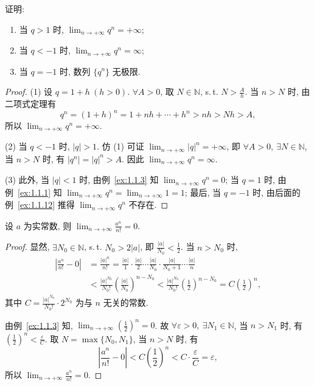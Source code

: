 \begin{example}\label{ex:1.1.4}
证明:
\begin{enumerate}
  \item 当 $q>1$ 时, $\lim_{n\to+\infty}q^n=+\infty$;
  \item 当 $q<-1$ 时, $\lim_{n\to+\infty}q^n=\infty$;
  \item 当 $q=-1$ 时, 数列 $\{q^n\}$ 无极限.
\end{enumerate}
\end{example}
\begin{proof}
(1) 设 $q=1+h\ (h>0)$. $\forall A>0$, 取 $N\in\mathbb{N}$, s.\,t. $N>\frac{A}{h}$. 当 $n>N$ 时, 由二项式定理有
\[
  q^n=(1+h)^n = 1+nh+\cdots+h^n > nh > Nh > A,
\]
所以 $\lim_{n\to+\infty}q^n=+\infty$.

(2) 当 $q<-1$ 时, $|q|>1$. 仿 (1) 可证 $\lim_{n\to+\infty}|q|^n=+\infty$, 即 $\forall A>0,\ \exists N\in\mathbb{N}$, 当 $n>N$ 时, 有 $|q^n|=|q|^n>A$. 因此 $\lim_{n\to+\infty}q^n=\infty$.

(3) 此外, 当 $|q|<1$ 时, 由例~\ref{ex:1.1.3} 知 $\lim_{n\to+\infty}q^n=0$; 当 $q=1$ 时, 由例~\ref{ex:1.1.1} 知 $\lim_{n\to+\infty}q^n=\lim_{n\to+\infty}1=1$; 最后, 当 $q=-1$ 时, 由后面的例~\ref{ex:1.1.12} 推得 $\lim_{n\to+\infty}q^n$ 不存在.
\end{proof}

\begin{example}\label{ex:1.1.5}
设 $a$ 为实常数, 则 $\lim_{n\to+\infty}\frac{a^n}{n!}=0$.
\end{example}
\begin{proof}
显然, $\exists N_{0} \in \mathbb{N}$, s.\,t. $N_{0}>2|a|$, 即 $\frac{|a|}{N_0}<\frac{1}{2}$. 当 $n>N_0$ 时,
\begin{align*}
  \left|\frac{a^{n}}{n!}-0\right| &= \frac{|a|^{n}}{n!} = \frac{|a|}{1}\cdot\frac{|a|}{2}\cdots\frac{|a|}{N_{0}}\cdot\frac{|a|}{N_{0}+1}\cdots\frac{|a|}{n}\\
  &< \frac{|a|^{N_{0}}}{N_{0}!}\left(\frac{|a|}{N_{0}}\right)^{n-N_{0}} < \frac{|a|^{N_{0}}}{N_{0}!}\left(\frac{1}{2}\right)^{n-N_{0}} = C\left(\frac{1}{2}\right)^{n},
\end{align*}
其中 $C = \frac{|a|^{N_0}}{N_0!}\cdot 2^{N_0}$ 为与 $n$ 无关的常数.

由例~\ref{ex:1.1.3} 知, $\lim_{n\to+\infty}\left(\frac{1}{2}\right)^{n}=0$. 故 $\forall\varepsilon>0,\ \exists N_{1}\in\mathbb{N}$, 当 $n>N_1$ 时, 有 $\left(\frac{1}{2}\right)^{n}<\frac{\varepsilon}{C}$. 取 $N=\max\{N_0, N_1\}$, 当 $n>N$ 时, 有
\[
  \left|\frac{a^n}{n!}-0\right| < C\left(\frac{1}{2}\right)^n < C\cdot\frac{\varepsilon}{C}=\varepsilon,
\]
所以 $\lim_{n\to+\infty}\frac{a^n}{n!}=0$.
\end{proof}

